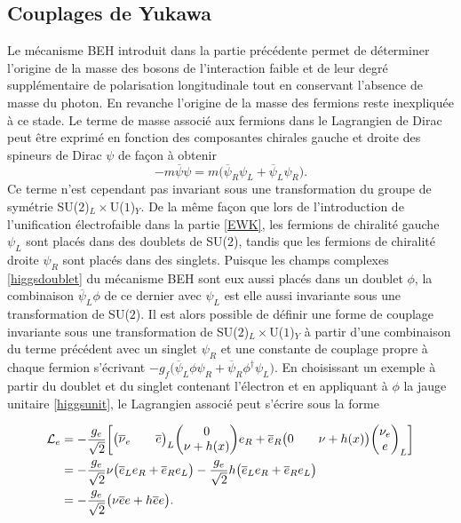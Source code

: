         \subsection{Couplages de Yukawa}
        \label{yukawa}

        Le mécanisme BEH introduit dans la partie précédente permet de déterminer l'origine de la masse des bosons de l'interaction faible et de leur degré supplémentaire de polarisation longitudinale tout en conservant l'absence de masse du photon. En revanche l'origine de la masse des fermions reste inexpliquée à ce stade. Le terme de masse associé aux fermions dans le Lagrangien de Dirac peut être exprimé en fonction des composantes chirales gauche et droite des spineurs de Dirac $\psi$ de façon à obtenir $$-m\overline{\psi}\psi=m\bigl(\overline{\psi}_R\psi_L+\overline{\psi}_L\psi_R\bigr).$$ Ce terme n'est cependant pas invariant sous une transformation du groupe de symétrie SU($2$)$_L\times$U($1$)$_Y$. De la même façon que lors de l'introduction de l'unification électrofaible dans la partie \ref{EWK}, les fermions de chiralité gauche $\psi_L$ sont placés dans des doublets de SU($2$), tandis que les fermions de chiralité droite $\psi_R$ sont placés dans des singlets. Puisque les champs complexes \ref{higgsdoublet} du mécanisme BEH sont eux aussi placés dans un doublet $\phi$, la combinaison $\overline{\psi}_L\phi$ de ce dernier avec $\psi_L$ est elle aussi invariante sous une transformation de SU($2$). Il est alors possible de définir une forme de couplage invariante sous une transformation de SU($2$)$_L\times$U($1$)$_Y$ à partir d'une combinaison du terme précédent avec un singlet $\psi_R$ et une constante de couplage propre à chaque fermion s'écrivant $-g_f\bigl(\overline{\psi}_L\phi\psi_R+\overline{\psi}_R\phi^{\dag}\psi_L\bigr)$. En choisissant un exemple à partir du doublet et du singlet contenant l'électron et en appliquant à $\phi$ la jauge unitaire \ref{higgsunit}, le Lagrangien associé peut s'écrire sous la forme

        \begin{align*}
             \mathcal{L}_e & = -\frac{g_e}{\sqrt{2}}\mqty[\mqty(\overline{\nu}_e&&\overline{e})_L\mqty(0\\\nu+h(x))e_R+\overline{e}_R\mqty(0&&\nu+h(x))\mqty(\nu_e\\e)_L] \vspace{5pt} \\
             & = -\frac{g_e}{\sqrt{2}}\nu\bigl(\overline{e}_Le_R+\overline{e}_Re_L\bigr)-\frac{g_e}{\sqrt{2}}h\bigl(\overline{e}_Le_R+\overline{e}_Re_L\bigr) \vspace{5pt} \\
             & = -\frac{g_e}{\sqrt{2}}\bigl(\nu\overline{e}e+h\overline{e}e\bigr).
        \end{align*}

